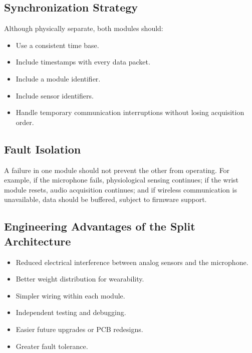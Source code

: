 \subsection{Synchronization Strategy}
\label{sec:synchronization-strategy}

Although physically separate, both modules should:
\begin{itemize}
    \item Use a consistent time base.
    \item Include timestamps with every data packet.
    \item Include a module identifier.
    \item Include sensor identifiers.
    \item Handle temporary communication interruptions without losing acquisition order.
\end{itemize}

\subsection{Fault Isolation}
\label{sec:fault-isolation}

A failure in one module should not prevent the other from operating. For example, if the microphone fails, physiological sensing continues; if the wrist module resets, audio acquisition continues; and if wireless communication is unavailable, data should be buffered, subject to firmware support.

\subsection{Engineering Advantages of the Split Architecture}
\label{sec:split-architecture-advantages}

\begin{observationbox}
\begin{itemize}
    \item Reduced electrical interference between analog sensors and the microphone.
    \item Better weight distribution for wearability.
    \item Simpler wiring within each module.
    \item Independent testing and debugging.
    \item Easier future upgrades or PCB redesigns.
    \item Greater fault tolerance.
\end{itemize}
\end{observationbox}

